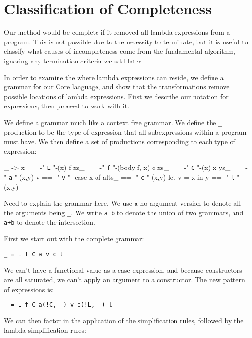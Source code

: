 \documentclass[preprint]{sigplanconf}
\begin{document}
\section{Classification of Completeness}

Our method would be complete if it removed all lambda expressions from a program. This is not possible due to the necessity to terminate, but it is useful to classify what causes of incompleteness come from the fundamental algorithm, ignoring any termination criteria we add later.

In order to examine the where lambda expressions can reside, we define a grammar for our Core language, and show that the transformations remove possible locations of lambda expressions. First we describe our notation for expressions, then proceed to work with it.

We define a grammar much like a context free grammar. We define the \verb"_" production to be the type of expression that all subexpressions within a program must have. We then define a set of productions corresponding to each type of expression:

\begin{code}
\vs_ -> x         == {-" \texttt{L} "-}(x)
f xs_             == {-" \texttt{f} "-}(body f, x)
c xs_             == {-" \texttt{C} "-}(x)
x ys_             == {-" \texttt{a} "-}(x,y)
v                 == {-" \texttt{v} "-}
case x of alts_   == {-" \texttt{c} "-}(x,y)
let v = x in y    == {-" \texttt{l} "-}(x,y)
\end{code}

Need to explain the grammar here. We use a no argument version to denote all the arguments being \verb"_". We write \verb"a b" to denote the union of two grammars, and \verb"a+b" to denote the intersection.

First we start out with the complete grammar:

\begin{verbatim}
_ = L f C a v c l
\end{verbatim}

We can't have a functional value as a case expression, and because constructors are all saturated, we can't apply an argument to a constructor. The new pattern of expressions is:

\begin{verbatim}
_ = L f C a(!C, _) v c(!L, _) l
\end{verbatim}

We can then factor in the application of the simplification rules, followed by the lambda simplification rules:
\end{document}
